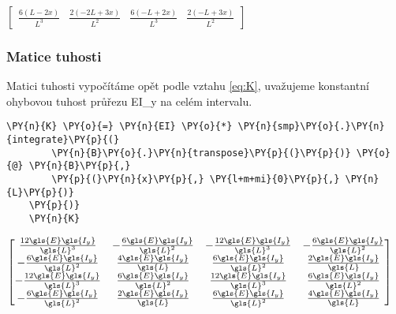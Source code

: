         
    $\displaystyle \left[\begin{matrix}\frac{6 \left(L - 2 x\right)}{L^{3}} & \frac{2 \left(- 2 L + 3 x\right)}{L^{2}} & \frac{6 \left(- L + 2 x\right)}{L^{3}} & \frac{2 \left(- L + 3 x\right)}{L^{2}}\end{matrix}\right]$
    
\vspace{0.5cm}

\subsubsection{Matice tuhosti} \label{sec:K_eb_beam}

Matici tuhosti vypočítáme opět podle vztahu \ref{eq:K}, uvažujeme konstantní ohybovou tuhost průřezu \gls{E}\gls{I_y} na celém intervalu.

\begin{tcolorbox}[breakable, size=fbox, boxrule=1pt, pad at break*=1mm,colback=cellbackground, colframe=cellborder]
    \begin{Verbatim}[commandchars=\\\{\}]
    \PY{n}{K} \PY{o}{=} \PY{n}{EI} \PY{o}{*} \PY{n}{smp}\PY{o}{.}\PY{n}{integrate}\PY{p}{(}
        \PY{n}{B}\PY{o}{.}\PY{n}{transpose}\PY{p}{(}\PY{p}{)} \PY{o}{@} \PY{n}{B}\PY{p}{,} 
        \PY{p}{(}\PY{n}{x}\PY{p}{,} \PY{l+m+mi}{0}\PY{p}{,} \PY{n}{L}\PY{p}{)}
    \PY{p}{)}
    \PY{n}{K}
    \end{Verbatim}
\end{tcolorbox}
     
    
    $\displaystyle \left[\begin{matrix}\frac{12 \gls{E}\gls{I_y}}{\gls{L}^{3}} & - \frac{6 \gls{E}\gls{I_y}}{\gls{L}^{2}} & - \frac{12 \gls{E}\gls{I_y}}{\gls{L}^{3}} & - \frac{6 \gls{E}\gls{I_y}}{\gls{L}^{2}}\\- \frac{6 \gls{E}\gls{I_y}}{\gls{L}^{2}} & \frac{4 \gls{E}\gls{I_y}}{\gls{L}} & \frac{6 \gls{E}\gls{I_y}}{\gls{L}^{2}} & \frac{2 \gls{E}\gls{I_y}}{\gls{L}}\\- \frac{12 \gls{E}\gls{I_y}}{\gls{L}^{3}} & \frac{6 \gls{E}\gls{I_y}}{\gls{L}^{2}} & \frac{12 \gls{E}\gls{I_y}}{\gls{L}^{3}} & \frac{6 \gls{E}\gls{I_y}}{\gls{L}^{2}}\\- \frac{6 \gls{E}\gls{I_y}}{\gls{L}^{2}} & \frac{2 \gls{E}\gls{I_y}}{\gls{L}} & \frac{6 \gls{E}\gls{I_y}}{\gls{L}^{2}} & \frac{4 \gls{E}\gls{I_y}}{\gls{L}}\end{matrix}\right]$
    
